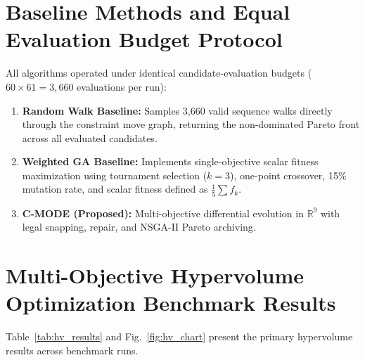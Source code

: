 \documentclass[12pt,a4paper]{report}
\begin{document}
\section{Baseline Methods and Equal Evaluation Budget Protocol}
All algorithms operated under identical candidate-evaluation budgets ($60 \times 61 = 3,660$ evaluations per run):
\begin{enumerate}
    \item \textbf{Random Walk Baseline:} Samples 3,660 valid sequence walks directly through the constraint move graph, returning the non-dominated Pareto front across all evaluated candidates.
    \item \textbf{Weighted GA Baseline:} Implements single-objective scalar fitness maximization using tournament selection ($k=3$), one-point crossover, 15\% mutation rate, and scalar fitness defined as $\frac{1}{5}\sum f_k$.
    \item \textbf{C-MODE (Proposed):} Multi-objective differential evolution in $\mathbb{R}^9$ with legal snapping, repair, and NSGA-II Pareto archiving.
\end{enumerate}

\section{Multi-Objective Hypervolume Optimization Benchmark Results}
Table~\ref{tab:hv_results} and Fig.~\ref{fig:hv_chart} present the primary hypervolume results across benchmark runs.
\end{document}
